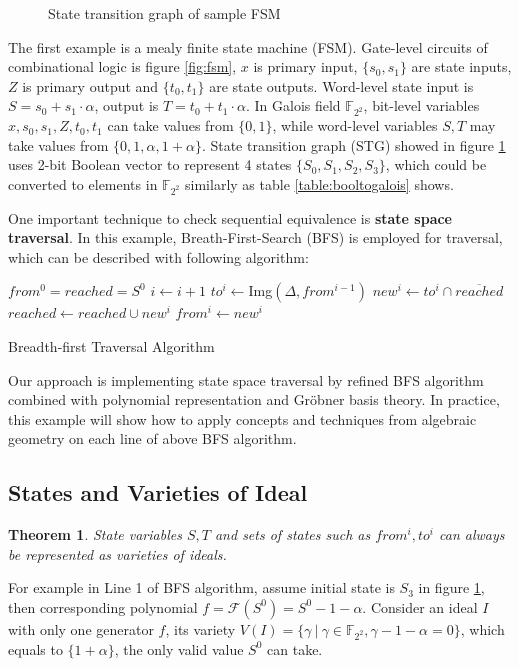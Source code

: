 \documentclass{acm_proc_article-sp}
\newtheorem{Theorem}{Theorem}
\begin{document}
\begin{figure}
\centering
{}
\caption{State transition graph of sample FSM}
\label{fig:stg}
\end{figure}

The first example is a mealy finite state machine (FSM). Gate-level circuits of combinational logic
is figure \ref{fig:fsm}, $x$ is primary input,
$\{s_0, s_1\}$ are state inputs, $Z$ is primary output and $\{t_0, t_1\}$ are state outputs.
Word-level state input is $S = s_0 + s_1\cdot\alpha$, output is $T = t_0 + t_1\cdot\alpha$. In Galois field
$\mathbb{F}_{2^2}$, bit-level variables $x, s_0, s_1, Z, t_0, t_1$ can take values from $\{0, 1\}$, while
word-level variables $S, T$ may take values from $\{0, 1, \alpha, 1 + \alpha\}$. State transition graph (STG)
showed in figure \ref{fig:stg} uses 2-bit Boolean vector to represent 4 states $\{S_0, S_1, S_2, S_3\}$, which
could be converted to elements in $\mathbb{F}_{2^2}$ similarly as table \ref{table:booltogalois} shows.

One important technique to check sequential equivalence is \textbf{state space traversal}. In this example,
Breath-First-Search (BFS) is employed for traversal, which can be described with following algorithm:

\begin{algorithm}[hbt]
\SetAlgoNoLine

  $from^0 = reached = S^0$\;
  {
  	$i \gets i + 1$\;
	$to^i \gets$Img$(\Delta, from^{i-1})$\;
	$new^i \gets to^i \cap \overline{reached}$\;
  	$reached \gets reached \cup new^i$\;
	$from^i \gets new^i$\;
  }
\caption {Breadth-first Traversal Algorithm}\label{alg:BFS}
\end{algorithm}

Our approach is implementing state space traversal by refined BFS algorithm combined with polynomial representation
and Gr\"obner basis theory. In practice, this example will show how to apply concepts and techniques from algebraic
geometry on each line of above BFS algorithm.

\subsection{States and Varieties of Ideal}

\begin{Theorem}
State variables $S, T$ and sets of states such as $from^i, to^i$ can always be represented as varieties of ideals.
\end{Theorem}
For example in Line 1 of BFS algorithm, assume initial state is $S_3$ in figure \ref{fig:stg}, then corresponding
polynomial $f = \mathcal{F}(S^0) = S^0 - 1 - \alpha$. Consider an ideal $I$ with only one generator $f$, its variety
$V(I) = \{\gamma\ |\ \gamma \in \mathbb{F}_{2^2}, \gamma - 1 - \alpha = 0\}$, which equals to $\{1 + \alpha\}$, the only
valid value $S^0$ can take.
\end{document}

